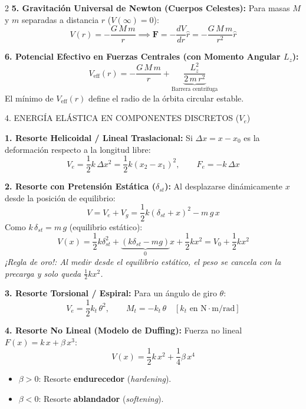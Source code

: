 \documentclass[10pt,a4paper]{article}
\newcommand{\seccion}[1]{%
  \vspace{2mm}%
  \noindent\colorbox{urlblue}{\parbox{\dimexpr\linewidth-2\fboxsep\relax}{%
    \color{white}\footnotesize\bfseries\strut\MakeUppercase{#1}}}%
  \vspace{1.5mm}%
}
\begin{document}
\begin{multicols}{2}
\textbf{5. Gravitación Universal de Newton (Cuerpos Celestes):}
Para masas $M$ y $m$ separadas a distancia $r$ ($V(\infty) = 0$):
\begin{equation*}
  V(r) = -\frac{G\,M\,m}{r} \implies \mathbf{F} = -\frac{d V}{dr}\hat{r} = -\frac{G\,M\,m}{r^2}\hat{r}
\end{equation*}

\textbf{6. Potencial Efectivo en Fuerzas Centrales (con Momento Angular $L_z$):}
\begin{equation*}
  V_{\text{eff}}(r) = -\frac{G\,M\,m}{r} + \underbrace{\frac{L_z^2}{2\,m\,r^2}}_{\text{Barrera centrífuga}}
\end{equation*}
El mínimo de $V_{\text{eff}}(r)$ define el radio de la órbita circular estable.

\columnbreak

\seccion{4. Energía Elástica en Componentes Discretos ($V_e$)}

\textbf{1. Resorte Helicoidal / Lineal Traslacional:}
Si $\Delta x = x - x_0$ es la deformación respecto a la longitud libre:
\begin{equation*}
  V_e = \frac{1}{2} k\,\Delta x^2 = \frac{1}{2} k (x_2 - x_1)^2, \qquad F_e = -k\,\Delta x
\end{equation*}

\textbf{2. Resorte con Pretensión Estática ($\delta_{st}$):}
Al desplazarse dinámicamente $x$ desde la posición de equilibrio:
\begin{equation*}
  V = V_e + V_g = \frac{1}{2}k(\delta_{st} + x)^2 - m\,g\,x
\end{equation*}
Como $k\,\delta_{st} = m\,g$ (equilibrio estático):
\begin{equation*}
  V(x) = \frac{1}{2} k \delta_{st}^2 + \underbrace{(k\delta_{st} - mg)}_{0}x + \frac{1}{2}k x^2 = V_0 + \frac{1}{2}k x^2
\end{equation*}
\textit{¡Regla de oro!: Al medir desde el equilibrio estático, el peso se cancela con la precarga y solo queda $\frac{1}{2}kx^2$.}

\textbf{3. Resorte Torsional / Espiral:}
Para un ángulo de giro $\theta$:
\begin{equation*}
  V_e = \frac{1}{2} k_t\,\theta^2, \qquad M_t = -k_t\,\theta \quad [k_t \text{ en } \mathrm{N\cdot m/rad}]
\end{equation*}

\textbf{4. Resorte No Lineal (Modelo de Duffing):}
Fuerza no lineal $F(x) = k\,x + \beta\,x^3$:
\begin{equation*}
  V(x) = \frac{1}{2} k\,x^2 + \frac{1}{4} \beta\,x^4
\end{equation*}
\begin{itemize}\setlength{\itemsep}{0pt}\setlength{\parskip}{0pt}
  \item $\beta > 0$: Resorte \textbf{endurecedor} (\textit{hardening}).
  \item $\beta < 0$: Resorte \textbf{ablandador} (\textit{softening}).
\end{itemize}


\end{multicols}
\end{document}
